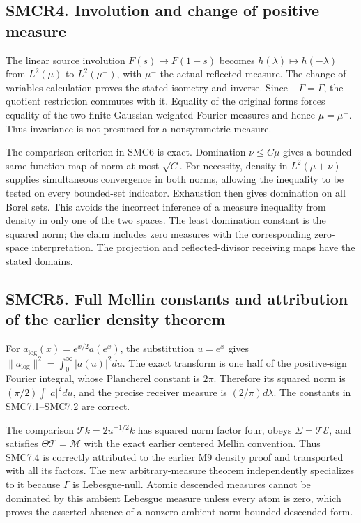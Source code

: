 \subsection{SMCR4. Involution and change of positive
measure}\label{smcr4.-involution-and-change-of-positive-measure}

The linear source involution \(F(s)\mapsto F(1-s)\) becomes
\(h(\lambda)\mapsto h(-\lambda)\) from \(L^2(\mu)\) to \(L^2(\mu^-)\),
with \(\mu^-\) the actual reflected measure. The change-of-variables
calculation proves the stated isometry and inverse. Since
\(-\Gamma=\Gamma\), the quotient restriction commutes with it. Equality
of the original forms forces equality of the two finite
Gaussian-weighted Fourier measures and hence \(\mu=\mu^-\). Thus
invariance is not presumed for a nonsymmetric measure.

The comparison criterion in SMC6 is exact. Domination \(\nu\le C\mu\)
gives a bounded same-function map of norm at most \(\sqrt C\). For
necessity, density in \(L^2(\mu+\nu)\) supplies simultaneous convergence
in both norms, allowing the inequality to be tested on every bounded-set
indicator. Exhaustion then gives domination on all Borel sets. This
avoids the incorrect inference of a measure inequality from density in
only one of the two spaces. The least domination constant is the squared
norm; the claim includes zero measures with the corresponding zero-space
interpretation. The projection and reflected-divisor receiving maps have
the stated domains.

\subsection{SMCR5. Full Mellin constants and attribution of the earlier
density
theorem}\label{smcr5.-full-mellin-constants-and-attribution-of-the-earlier-density-theorem}

For \(a_{\log}(x)=e^{x/2}a(e^x)\), the substitution \(u=e^x\) gives
\(\|a_{\log}\|^2=\int_0^\infty|a(u)|^2du\). The exact transform is one
half of the positive-sign Fourier integral, whose Plancherel constant is
\(2\pi\). Therefore its squared norm is \((\pi/2)\int|a|^2du\), and the
precise receiver measure is \((2/\pi)d\lambda\). The constants in
SMC7.1--SMC7.2 are correct.

The comparison \(\mathcal T k=2u^{-1/2}k\) has squared norm factor four,
obeys \(\Sigma=\mathcal T\mathcal E\), and satisfies
\(\Theta\mathcal T=\mathcal M\) with the exact earlier centered Mellin
convention. Thus SMC7.4 is correctly attributed to the earlier M9
density proof and transported with all its factors. The new
arbitrary-measure theorem independently specializes to it because
\(\Gamma\) is Lebesgue-null. Atomic descended measures cannot be
dominated by this ambient Lebesgue measure unless every atom is zero,
which proves the asserted absence of a nonzero ambient-norm-bounded
descended form.

